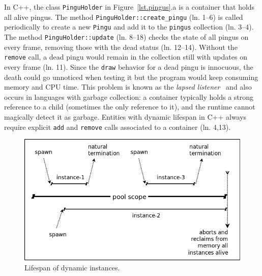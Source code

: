 \documentclass{vgtc}                          %
\newcommand{\code}[1] {{\small{\texttt{#1}}}}
\begin{document}
In C++, the class \code{PinguHolder} in Figure~\ref{lst.pingus}.a is a
container that holds all alive pingus.
%
The method \code{PinguHolder::create\_pingu} (ln. 1--6) is called periodically
to create a new \code{Pingu} and add it to the \code{pingus} collection
(ln. 3--4).
The method \code{PinguHolder::update} (ln. 8--18) checks the state of all
pingus on every frame, removing those with the dead status (ln. 12--14).
%
Without the \code{remove} call, a dead pingu would remain in the collection
still with updates on every frame (ln. 11).
Since the \code{draw} behavior for a dead pingu is innocuous, the death could
go unnoticed when testing it but the program would keep consuming memory and
CPU time.
%
This problem is known as the \emph{lapsed listener}~\cite{games.patterns} and
also occurs in languages with garbage collection:
a container typically holds a strong reference to a child (sometimes the only 
reference to it), and the runtime cannot magically detect it as garbage.
%
Entities with dynamic lifespan in C++ always require explicit \code{add} and
\code{remove} calls associated to a container (ln. 4,13).

\begin{figure}[t]
\centering
\includegraphics[width=\columnwidth]{pool}
\caption{Lifespan of dynamic instances.
\label{fig.pool}
}
\end{figure}
\end{document}
